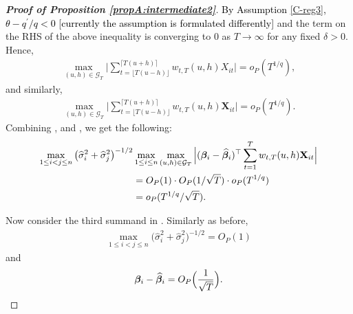 \documentclass[a4paper,12pt]{article}
\makeatletter
\renewcommand{\eqref}[1]{\tagform@{\ref{#1}}}
\makeatother
\begin{document}
\begin{proof}[\textnormal{\textbf{Proof of Proposition \ref{propA:intermediate2}}}]
\textcolor{black}{By Assumption \ref{C-reg3}, $\theta - q^\prime/q <0$ [currently the assumption is formulated differently]} and the term on the RHS of the above inequality is converging to $0$ as $T \to \infty$ for any fixed $\delta >0$. Hence, 
{\color{black}\begin{align*}
\max_{(u, h) \in \mathcal{G}_T} \bigg| \sum_{t=\lfloor T(u-h) \rfloor}^{\lceil T(u+h) \rceil} w_{t,T}(u,h)X_{it}  \bigg| = o_P(T^{1/q}),
\end{align*}
and similarly,
\begin{align}\label{ineq-diff-9}
\max_{(u, h) \in \mathcal{G}_T} \bigg| \sum_{t=\lfloor T(u-h) \rfloor}^{\lceil T(u+h) \rceil} w_{t,T}(u,h)\mathbf{X}_{it}  \bigg| = o_P(T^{1/q}).
\end{align}}
Combining \eqref{ineq-diff-6}, \eqref{ineq-diff-7} and \eqref{ineq-diff-9}, we get the following:
{\color{black}\begin{align}\label{ineq-diff-10}
\begin{split}
\max_{1\le i < j \le n} \big(\widehat{\sigma}_i^2+ \widehat{\sigma}_j^2 \big)^{-1/2}&\max_{1\le i \le n} \max_{(u,h) \in \mathcal{G}_T} \Big| (\bm{\beta}_i - \widehat{\bm{\beta}}_i)^\top\sum_{t=1}^T w_{t,T}(u,h) \mathbf{X}_{it} \Big|  \\
&=O_P(1) \cdot O_P(1/\sqrt{T}) \cdot o_P(T^{1/q}) \\
&= o_P(T^{1/q}/\sqrt{T}).
\end{split}
\end{align}}


Now consider the third summand in \eqref{ineq-diff-1}. Similarly as before, 
\begin{align}\label{ineq-diff-11}
\max_{1\le i < j \le n}\big(\widehat{\sigma}_i^2+ \widehat{\sigma}_j^2 \big)^{-1/2}  = O_P(1)
\end{align}
and
\begin{align}\label{ineq-diff-12}
\bm{\beta}_i - \widehat{\bm{\beta}}_i = O_P\Big(\frac{1}{\sqrt{T}}\Big).
\end{align}


\end{proof}
\end{document}
